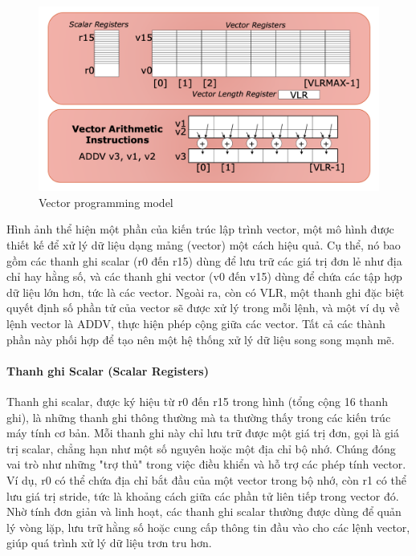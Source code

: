 \documentclass[a4paper]{article}
\begin{document}
\begin{figure}[H]
     \centering
     \includegraphics[scale =0.4]{assets/vector-programming-model.png}
     \caption{Vector programming model}
     \label{fig:2ss}
 \end{figure}

 Hình ảnh thể hiện một phần của kiến trúc lập trình vector, một mô hình được thiết kế để xử lý dữ liệu dạng mảng (vector) một cách hiệu quả. Cụ thể, nó bao gồm các thanh ghi scalar (r0 đến r15) dùng để lưu trữ các giá trị đơn lẻ như địa chỉ hay hằng số, và các thanh ghi vector (v0 đến v15) dùng để chứa các tập hợp dữ liệu lớn hơn, tức là các vector. Ngoài ra, còn có VLR, một thanh ghi đặc biệt quyết định số phần tử của vector sẽ được xử lý trong mỗi lệnh, và một ví dụ về lệnh vector là ADDV, thực hiện phép cộng giữa các vector. Tất cả các thành phần này phối hợp để tạo nên một hệ thống xử lý dữ liệu song song mạnh mẽ.

\paragraph{Thanh ghi Scalar (Scalar Registers)}

Thanh ghi scalar, được ký hiệu từ r0 đến r15 trong hình (tổng cộng 16 thanh ghi), là những thanh ghi thông thường mà ta thường thấy trong các kiến trúc máy tính cơ bản. Mỗi thanh ghi này chỉ lưu trữ được một giá trị đơn, gọi là giá trị scalar, chẳng hạn như một số nguyên hoặc một địa chỉ bộ nhớ. Chúng đóng vai trò như những "trợ thủ" trong việc điều khiển và hỗ trợ các phép tính vector. Ví dụ, r0 có thể chứa địa chỉ bắt đầu của một vector trong bộ nhớ, còn r1 có thể lưu giá trị stride, tức là khoảng cách giữa các phần tử liên tiếp trong vector đó. Nhờ tính đơn giản và linh hoạt, các thanh ghi scalar thường được dùng để quản lý vòng lặp, lưu trữ hằng số hoặc cung cấp thông tin đầu vào cho các lệnh vector, giúp quá trình xử lý dữ liệu trơn tru hơn.
\end{document}
